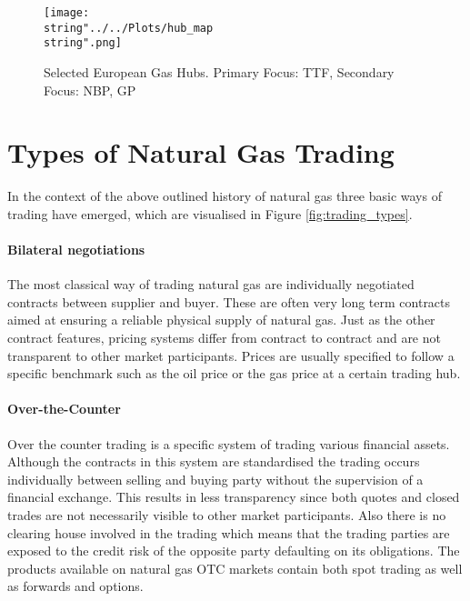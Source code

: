 \begin{figure}[H]
  \centering
\texttt{[image: \\string"../../Plots/hub\_map\\string".png]}
  \caption{Selected European Gas Hubs. Primary Focus: TTF, Secondary Focus: NBP, GP}\label{fig:hub_map}
\end{figure}

\section{Types of Natural Gas Trading}
In the context of the above outlined history of natural gas three basic ways of trading have emerged, which are visualised in Figure \ref{fig:trading_types}.

\paragraph{Bilateral negotiations}
The most classical way of trading natural gas are individually negotiated contracts between supplier and buyer. These are often very long term contracts aimed at ensuring a reliable physical supply of natural gas. Just as the other contract features, pricing systems differ from contract to contract and are not transparent to other market participants. Prices are usually specified to follow a specific benchmark such as the oil price or the gas price at a certain trading hub. 

\paragraph{Over-the-Counter}
Over the counter trading is a specific system of trading various financial assets. Although the contracts in this system are standardised the trading occurs individually between selling and buying party without the supervision of a financial exchange. This results in less transparency since both quotes and closed trades are not necessarily visible to other market participants. Also there is no clearing house involved in the trading which means that the trading parties are exposed to the credit risk of the opposite party defaulting on its obligations. The products available on natural gas OTC markets contain both spot trading as well as forwards and options.

